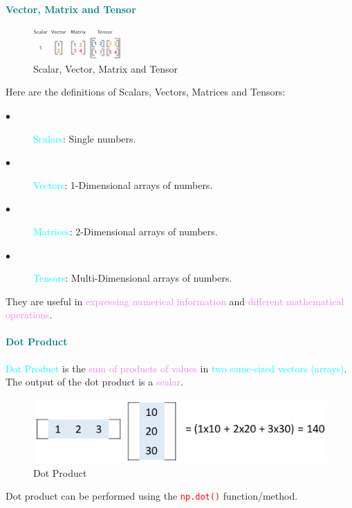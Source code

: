 \documentclass{book}
\begin{document}
\textcolor{teal}{\paragraph{Vector, Matrix and Tensor}}
\FloatBarrier
\begin{figure}
    \centering
    \includegraphics[width = 0.3\textwidth]{chapter 2/ch2_figure2.jpeg}
    \caption{Scalar, Vector, Matrix and Tensor}
\end{figure}
Here are the definitions of Scalars, Vectors, Matrices and Tensors:\\
\begin{description}    
    \item[$\bullet$] \textcolor{cyan}{Scalars}: Single numbers.
    \item[$\bullet$] \textcolor{cyan}{Vectors}: 1-Dimensional arrays of numbers.
    \item[$\bullet$] \textcolor{cyan}{Matrices}: 2-Dimensional arrays of numbers.
    \item[$\bullet$] \textcolor{cyan}{Tensors}: Multi-Dimensional arrays of numbers.
\end{description}
They are useful in \textcolor{violet}{expressing numerical information} and 
\textcolor{violet}{different mathematical operations}.
\textcolor{teal}{\paragraph{Dot Product}}
\textcolor{cyan}{Dot Product} is the \textcolor{violet}{sum of products of values} in \textcolor{cyan}{two same-sized vectors (arrays)}.\\
The output of the dot product is a \textcolor{violet}{scalar}.\\
\begin{figure}[h]
    \centering
    \includegraphics[scale=0.75]{chapter 2/ch2_figure3.jpeg}
    \caption{Dot Product}
\end{figure}
Dot product can be performed using the \textcolor{red}{\texttt{np.dot()}} function/method.\\
\end{document}
